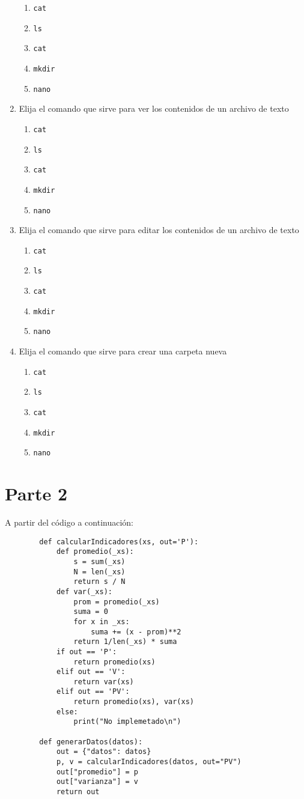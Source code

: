 \documentclass{article}
\newcommand{\code}[1]{\texttt{#1}}
\newcommand{\alternatives}[5]{
    \begin{enumerate}
        \item #1
        \item #2
        \item #3
        \item #4
        \item #5
    \end{enumerate}
}
\begin{document}
\begin{enumerate}
        \alternatives{\code{cat}}{\code{ls}}{\code{cat}}{\code{mkdir}}{\code{nano}}

        \item Elija el comando que sirve para ver los contenidos de un archivo de texto

        \alternatives{\code{cat}}{\code{ls}}{\code{cat}}{\code{mkdir}}{\code{nano}}

        \item Elija el comando que sirve para editar los contenidos de un archivo de texto

        \alternatives{\code{cat}}{\code{ls}}{\code{cat}}{\code{mkdir}}{\code{nano}}

        \item Elija el comando que sirve para crear una carpeta nueva

        \alternatives{\code{cat}}{\code{ls}}{\code{cat}}{\code{mkdir}}{\code{nano}}
    \end{enumerate}

\newpage
\section*{Parte 2}
A partir del código a continuación:
    \begin{verbatim}
        def calcularIndicadores(xs, out='P'):
            def promedio(_xs):
                s = sum(_xs)
                N = len(_xs)
                return s / N
            def var(_xs):
                prom = promedio(_xs)
                suma = 0
                for x in _xs: 
                    suma += (x - prom)**2
                return 1/len(_xs) * suma
            if out == 'P':
                return promedio(xs)
            elif out == 'V':
                return var(xs)
            elif out == 'PV':
                return promedio(xs), var(xs)
            else: 
                print("No implemetado\n")
            
        def generarDatos(datos):
            out = {"datos": datos}
            p, v = calcularIndicadores(datos, out="PV")
            out["promedio"] = p
            out["varianza"] = v
            return out
    \end{verbatim}
\end{document}
